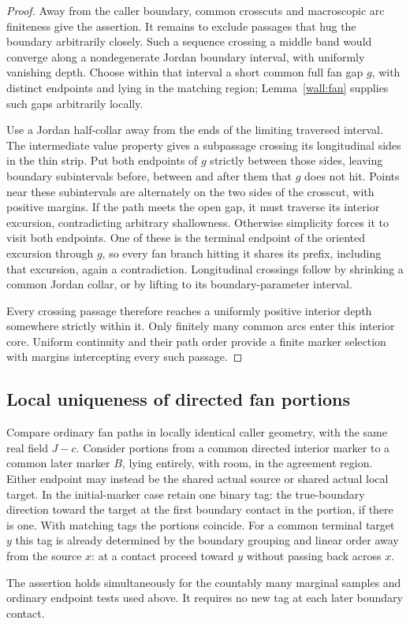 \begin{proof}
Away from the caller boundary, common crosscuts and macroscopic arc finiteness give the assertion.  It remains to exclude passages that hug the boundary arbitrarily closely.  Such a sequence crossing a middle band would converge along a nondegenerate Jordan boundary interval, with uniformly vanishing depth.  Choose within that interval a short common full fan gap $g$, with distinct endpoints and lying in the matching region; Lemma~\ref{wall:fan} supplies such gaps arbitrarily locally.

Use a Jordan half-collar away from the ends of the limiting traversed interval.  The intermediate value property gives a subpassage crossing its longitudinal sides in the thin strip.  Put both endpoints of $g$ strictly between those sides, leaving boundary subintervals before, between and after them that $g$ does not hit.  Points near these subintervals are alternately on the two sides of the crosscut, with positive margins.  If the path meets the open gap, it must traverse its interior excursion, contradicting arbitrary shallowness.  Otherwise simplicity forces it to visit both endpoints.  One of these is the terminal endpoint of the oriented excursion through $g$, so every fan branch hitting it shares its prefix, including that excursion, again a contradiction.  Longitudinal crossings follow by shrinking a common Jordan collar, or by lifting to its boundary-parameter interval.

Every crossing passage therefore reaches a uniformly positive interior depth somewhere strictly within it.  Only finitely many common arcs enter this interior core.  Uniform continuity and their path order provide a finite marker selection with margins intercepting every such passage.
\end{proof}
\subsection{Local uniqueness of directed fan portions}

\begin{proposition}\label{wall:fan-local-uniqueness}
Compare ordinary fan paths in locally identical caller geometry, with the same real field $J-c$.  Consider portions from a common directed interior marker to a common later marker $B$, lying entirely, with room, in the agreement region.  Either endpoint may instead be the shared actual source or shared actual local target.  In the initial-marker case retain one binary tag: the true-boundary direction toward the target at the first boundary contact in the portion, if there is one.  With matching tags the portions coincide.  For a common terminal target $y$ this tag is already determined by the boundary grouping and linear order away from the source $x$: at a contact proceed toward $y$ without passing back across $x$.

The assertion holds simultaneously for the countably many marginal samples and ordinary endpoint tests used above.  It requires no new tag at each later boundary contact.
\end{proposition}

